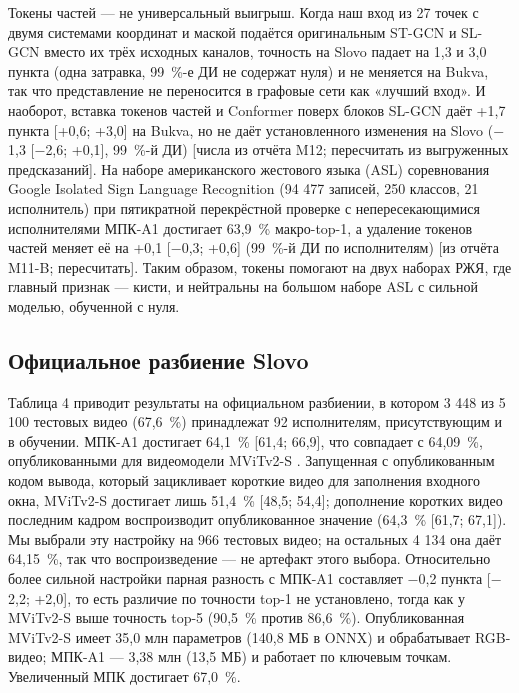 \documentclass[a4paper,fleqn]{cas-dc}
\begin{document}
Токены частей --- не универсальный выигрыш. Когда наш вход из 27 точек с двумя системами координат и маской подаётся оригинальным ST-GCN и SL-GCN вместо их трёх исходных каналов, точность на Slovo падает на 1,3 и 3,0 пункта (одна затравка, 99~\%-е ДИ не содержат нуля) и не меняется на Bukva, так что представление не переносится в графовые сети как «лучший вход». И наоборот, вставка токенов частей и Conformer поверх блоков SL-GCN даёт +1,7 пункта {[}+0,6; +3,0{]} на Bukva, но не даёт установленного изменения на Slovo ($-$1,3 {[}$-$2,6; +0,1{]}, 99~\%-й ДИ) {\color{red}[числа из отчёта M12; пересчитать из выгруженных предсказаний]}. На наборе американского жестового языка (ASL) соревнования Google Isolated Sign Language Recognition \cite{2023_kaggle_gislr} (94 477 записей, 250 классов, 21 исполнитель) при пятикратной перекрёстной проверке с непересекающимися исполнителями МПК-A1 достигает 63,9~\% макро-top-1, а удаление токенов частей меняет её на +0,1 {[}$-$0,3; +0,6{]} (99~\%-й ДИ по исполнителям) {\color{red}[из отчёта M11-B; пересчитать]}. Таким образом, токены помогают на двух наборах РЖЯ, где главный признак --- кисти, и нейтральны на большом наборе ASL с сильной моделью, обученной с нуля.

\hypertarget{ux43eux444ux438ux446ux438ux430ux43bux44cux43dux43eux435-ux440ux430ux437ux431ux438ux435ux43dux438ux435-slovo}{%
\subsection{Официальное разбиение Slovo}\label{ux43eux444ux438ux446ux438ux430ux43bux44cux43dux43eux435-ux440ux430ux437ux431ux438ux435ux43dux438ux435-slovo}}

Таблица 4 приводит результаты на официальном разбиении, в котором 3 448 из 5 100 тестовых видео (67,6~\%) принадлежат 92 исполнителям, присутствующим и в обучении. МПК-A1 достигает 64,1~\% {[}61,4; 66,9{]}, что совпадает с 64,09~\%, опубликованными для видеомодели MViTv2-S \cite{2023_kapitanov_slovo}. Запущенная с опубликованным кодом вывода, который зацикливает короткие видео для заполнения входного окна, MViTv2-S достигает лишь 51,4~\% {[}48,5; 54,4{]}; дополнение коротких видео последним кадром воспроизводит опубликованное значение (64,3~\% {[}61,7; 67,1{]}). Мы выбрали эту настройку на 966 тестовых видео; на остальных 4 134 она даёт 64,15~\%, так что воспроизведение --- не артефакт этого выбора. Относительно более сильной настройки парная разность с МПК-A1 составляет $-$0,2 пункта {[}$-$2,2; +2,0{]}, то есть различие по точности top-1 не установлено, тогда как у MViTv2-S выше точность top-5 (90,5~\% против 86,6~\%). Опубликованная MViTv2-S имеет 35,0 млн параметров (140,8 МБ в ONNX) и обрабатывает RGB-видео; МПК-A1 --- 3,38 млн (13,5 МБ) и работает по ключевым точкам. Увеличенный МПК достигает 67,0~\%.
\end{document}
